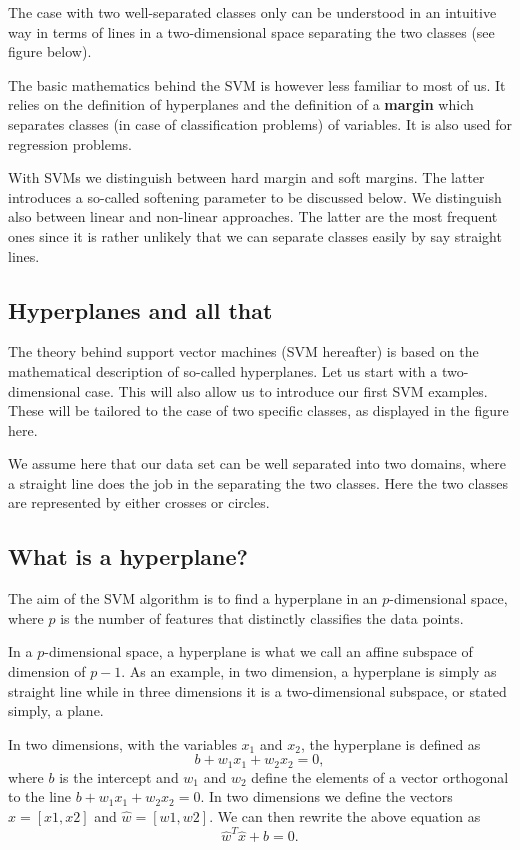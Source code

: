 \documentclass[%
oneside,                 %
final,                   %
10pt]{article}
\begin{document}
The case with two well-separated classes only can be understood in an intuitive way in terms of lines in a two-dimensional space separating the two classes (see figure below).  

The basic mathematics behind the SVM is however less familiar to most of us. 
It relies on the definition of hyperplanes and the
definition of a \textbf{margin} which separates classes (in case of
classification problems) of variables. It is also used for regression
problems.

With SVMs we distinguish between hard margin and soft margins. The latter introduces a so-called softening parameter to be discussed below.
We distinguish also between linear and non-linear approaches. The latter are the most frequent ones since it is rather unlikely that we can separate classes easily by say straight lines. 




\subsection{Hyperplanes and all that}

The theory behind support vector machines (SVM hereafter) is based on
the mathematical description of so-called hyperplanes. Let us start
with a two-dimensional case. This will also allow us to introduce our
first SVM examples. These will be tailored to the case of two specific
classes, as displayed in the figure here.

We assume here that our data set can be well separated into two
domains, where a straight line does the job in the separating the two
classes. Here the two classes are represented by either crosses or
circles.

\subsection{What is a hyperplane?}

The aim of the SVM algorithm is to find a hyperplane in an $p$-dimensional space, where $p$ is the number of features  that distinctly classifies the data points.  

In a $p$-dimensional space, a hyperplane is what we call an affine subspace of dimension of $p-1$.
As an example, in two dimension, a hyperplane is simply as straight line while in three dimensions it is 
a two-dimensional subspace, or stated simply, a plane. 

In two dimensions, with the variables $x_1$ and $x_2$, the hyperplane is defined as
\[
b+w_1x_1+w_2x_2=0,
\]
where $b$ is the intercept and $w_1$ and $w_2$ define the elements of a vector orthogonal to the line 
$b+w_1x_1+w_2x_2=0$. 
In two dimensions we define the vectors $\hat{x} =[x1,x2]$ and $\hat{w}=[w1,w2]$. 
We can then rewrite the above equation as 
\[
\hat{w}^T\hat{x}+b=0.
\]
\end{document}

